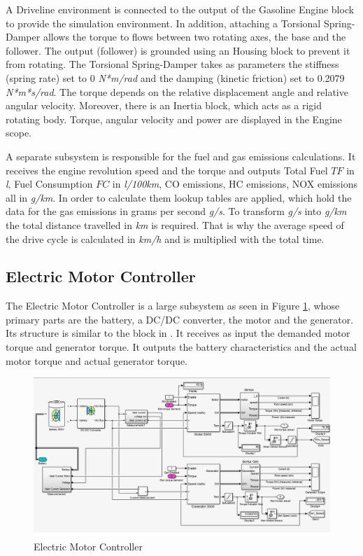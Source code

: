 A Driveline environment is connected to the output of the Gasoline Engine block to provide the simulation environment. In addition, attaching a Torsional Spring-Damper \citep{tsdMatlab} allows the torque to flows between two rotating axes, the base and the follower. The output (follower) is grounded using an Housing block to prevent it from rotating. The Torsional Spring-Damper takes as parameters the stiffness (spring rate) set to 0 \textit{N*m/rad} and the damping (kinetic friction) set to 0.2079 \textit{N*m*s/rad}. The torque depends on the relative displacement angle and relative angular velocity. Moreover, there is an Inertia block, which acts as a rigid rotating body. Torque, angular velocity and power are displayed in the Engine scope.

A separate subsystem is responsible for the fuel and gas emissions calculations. It receives the engine revolution speed and the torque and outputs Total Fuel $TF$ in \textit{l}, Fuel Consumption $FC$ in \textit{l/100km}, CO emissions, HC emissions, NOX emissions all in \textit{g/km}. In order to calculate them lookup tables are applied, which hold the data for the gas emissions in grams per second \textit{g/s}. To transform \textit{g/s} into \textit{g/km} the total distance travelled in \textit{km} is required. That is why the average speed of the drive cycle is calculated in \textit{km/h} and is multiplied with the total time. 

\subsection{Electric Motor Controller}
The Electric Motor Controller is a large subsystem as seen in Figure \ref{fig:motorController}, whose primary parts are the battery, a DC/DC converter, the motor and the generator. Its structure is similar to the block in \citep{hevMatlab}. It receives as input the demanded motor torque and generator torque. It outputs the battery characteristics and the actual motor torque and actual generator torque.

\begin{figure}[h]
\centering
\includegraphics[scale=0.48]{figures/hev/electricmotorcontroller}
\caption{Electric Motor Controller}
\label{fig:motorController}
\end{figure}

